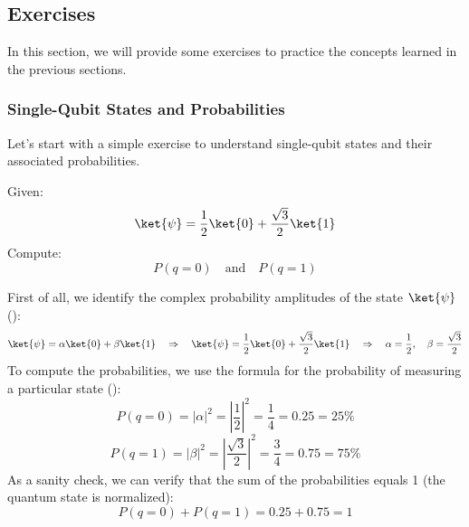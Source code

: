 \subsection{Exercises}

In this section, we will provide some exercises to practice the concepts learned in the previous sections.

\subsubsection{Single-Qubit States and Probabilities}\label{sec:single-qubit-states-and-probabilities}

Let's start with a simple exercise to understand single-qubit states and their associated probabilities.

\highspace
\exercise Given:
\begin{equation*}
    \ket{\psi} = \dfrac{1}{2}\ket{0} + \dfrac{\sqrt{3}}{2}\ket{1}
\end{equation*}
Compute:
\begin{equation*}
    P\left(q = 0\right) \quad \text{and} \quad P\left(q = 1\right)
\end{equation*}

\highspace
\solution First of all, we identify the complex probability amplitudes of the state $\ket{\psi}$ ():
\begin{equation*}
    \ket{\psi} = \alpha\ket{0} + \beta\ket{1} \quad \Rightarrow \quad \ket{\psi} = \dfrac{1}{2}\ket{0} + \dfrac{\sqrt{3}}{2}\ket{1} \quad \Rightarrow \quad \alpha = \dfrac{1}{2}, \quad \beta = \dfrac{\sqrt{3}}{2}
\end{equation*}
To compute the probabilities, we use the formula for the probability of measuring a particular state ():
\begin{equation*}
    P\left(q = 0\right) = \left|\alpha\right|^2 = \left|\dfrac{1}{2}\right|^2 = \dfrac{1}{4} = 0.25 = 25\%
\end{equation*}
\begin{equation*}
    P\left(q = 1\right) = \left|\beta\right|^2 = \left|\dfrac{\sqrt{3}}{2}\right|^2 = \dfrac{3}{4} = 0.75 = 75\%
\end{equation*}
As a sanity check, we can verify that the sum of the probabilities equals 1 (the quantum state is normalized):
\begin{equation*}
    P\left(q = 0\right) + P\left(q = 1\right) = 0.25 + 0.75 = 1
\end{equation*}

